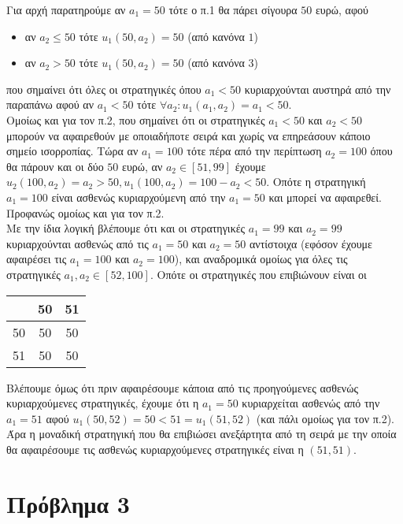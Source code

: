 \documentclass[a4paper,11pt]{article}
\begin{document}
Για αρχή παρατηρούμε αν $a_1=50$ τότε ο π.1 θα πάρει σίγουρα $50$ ευρώ, αφού
\begin{itemize}
	\item αν $a_2 \leq 50$ τότε $u_1(50,a_2) = 50$ (από κανόνα $1$)
	\item αν $a_2 > 50$ τότε $u_1(50,a_2) = 50$ (από κανόνα $3$)
\end{itemize}
που σημαίνει ότι όλες οι στρατηγικές όπου $a_1<50$ κυριαρχούνται αυστηρά από την παραπάνω αφού αν $a_1<50$ τότε $\forall a_2: u_1(a_1,a_2) = a_1 < 50$.
\\
Ομοίως και για τον π.2, που σημαίνει ότι οι στρατηγικές $a_1<50$ και $a_2<50$ μπορούν να αφαιρεθούν με οποιαδήποτε σειρά και χωρίς να επηρεάσουν κάποιο σημείο ισορροπίας.
\newpage
Τώρα αν $a_1=100$ τότε πέρα από την περίπτωση $a_2=100$ όπου θα πάρουν και οι δύο $50$ ευρώ, αν $a_2 \in [51, 99]$ έχουμε $u_2(100,a_2)=a_2>50,u_1(100,a_2)=100-a_2<50$. Οπότε η στρατηγική $a_1=100$ είναι ασθενώς κυριαρχούμενη από την $a_1=50$ και μπορεί να αφαιρεθεί. Προφανώς ομοίως και για τον π.2.
\\[8pt]
Με την ίδια λογική βλέπουμε ότι και οι στρατηγικές $a_1=99$ και $a_2=99$ κυριαρχούνται ασθενώς από τις $a_1=50$ και $a_2=50$ αντίστοιχα (εφόσον έχουμε αφαιρέσει τις $a_1=100$ και $a_2=100$), και αναδρομικά ομοίως για όλες τις στρατηγικές $a_1,a_2 \in [52,100]$. Οπότε οι στρατηγικές που επιβιώνουν είναι οι
\begin{center}
	\begin{tabular}{c || c | c}
		& 50 & 51\\
		\hline\hline
		50 & 50 & 50\\
		51 & 50 & 50
	\end{tabular}
\end{center}
Βλέπουμε όμως ότι πριν αφαιρέσουμε κάποια από τις προηγούμενες ασθενώς κυριαρχούμενες στρατηγικές, έχουμε ότι η $a_1=50$ κυριαρχείται ασθενώς από την $a_1=51$ αφού $u_1(50,52) = 50 < 51 = u_1(51,52)$ (και πάλι ομοίως για τον π.2).
\\[8pt]
Άρα η μοναδική στρατηγική που θα επιβιώσει ανεξάρτητα από τη σειρά με την οποία θα αφαιρέσουμε τις ασθενώς κυριαρχούμενες στρατηγικές είναι η $(51,51)$.


\section*{Πρόβλημα 3}
\end{document}
